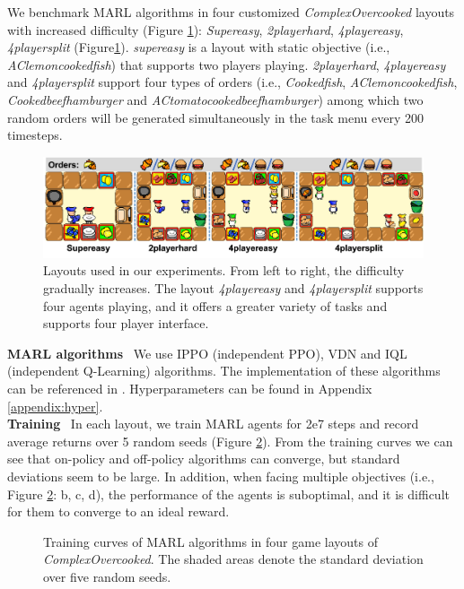 We benchmark MARL algorithms in four customized \textit{ComplexOvercooked} layouts with increased difficulty (Figure \ref{fig:exp_layouts}): \textit{Supereasy}, \textit{2playerhard}, \textit{4playereasy}, \textit{4playersplit} (Figure\ref{fig:exp_layouts}). \textit{supereasy} is a layout with static objective (i.e.,  \textit{AClemoncookedfish}) that supports two players playing. \textit{2playerhard}, \textit{4playereasy} and \textit{4playersplit} support four types of orders (i.e., \textit{Cookedfish}, \textit{AClemoncookedfish}, \textit{Cookedbeefhamburger} and \textit{ACtomatocookedbeefhamburger}) among which two random orders will be generated simultaneously in the task menu every 200 timesteps. \\
\begin{figure}[H]
    \centering
    \includegraphics[width=\linewidth]{Figures/4layouts.png}
  \caption{Layouts used in our experiments. From left to right, the difficulty gradually increases. The layout \textit{4playereasy} and \textit{4playersplit} supports four agents playing, and it offers a greater variety of tasks and supports four player interface.}
\label{fig:exp_layouts} 
\end{figure} 
\noindent\textbf{MARL algorithms} \ We use IPPO (independent PPO), VDN and IQL (independent Q-Learning) algorithms. The implementation of these algorithms can be referenced in \cite{papoudakis2020benchmarking}. Hyperparameters can be found in Appendix \ref{appendix:hyper}. \\
\noindent\textbf{Training} \ In each layout, we train MARL agents for 2e7 steps and record average returns over 5 random seeds (Figure \ref{fig:training_curves}). From the training curves we can see that on-policy and off-policy algorithms can converge, but standard deviations seem to be large. In addition, when facing multiple objectives (i.e.,  Figure \ref{fig:training_curves}: b, c, d), the performance of the agents is suboptimal, and it is difficult for them to converge to an ideal reward.

\begin{figure}[H]
    \centering
        \hfill
    \caption{Training curves of MARL algorithms in four game layouts of \textit{ComplexOvercooked}. The shaded areas denote the standard deviation over five random seeds.}
    \label{fig:training_curves}
\end{figure}
